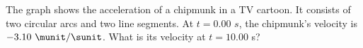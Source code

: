  The graph shows the acceleration of a chipmunk in a TV
cartoon. It consists of two circular arcs and two line
segments. At $t=0$.00 $s$, the chipmunk's velocity is 
$-3.10\ \munit/\sunit$. What is its velocity at $t=10.00$ s?
\answercheck
